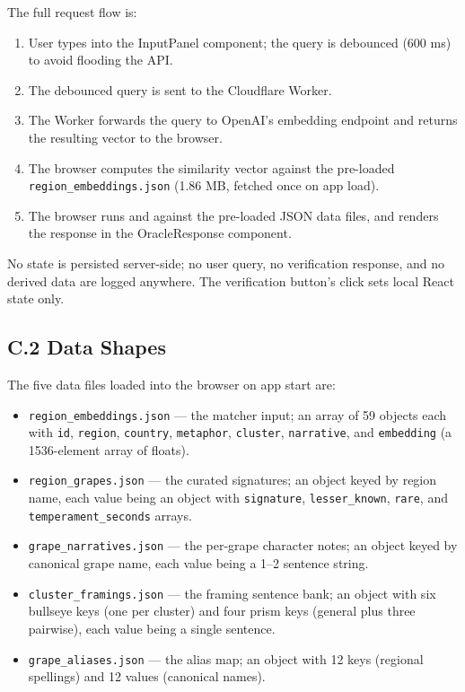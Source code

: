 \documentclass[11pt]{article}
\begin{document}
The full request flow is:

\begin{enumerate}[leftmargin=2em,itemsep=0.2em]
\item User types into the InputPanel component; the query is debounced (600 ms) to avoid flooding the API.
\item The debounced query is sent to the Cloudflare Worker.
\item The Worker forwards the query to OpenAI's embedding endpoint and returns the resulting vector to the browser.
\item The browser computes the similarity vector against the pre-loaded \texttt{region\_embeddings.json} (1.86 MB, fetched once on app load).
\item The browser runs  and  against the pre-loaded JSON data files, and renders the response in the OracleResponse component.
\end{enumerate}

No state is persisted server-side; no user query, no verification response, and no derived data are logged anywhere. The verification button's click sets local React state only.

\subsection*{C.2 Data Shapes}
The five data files loaded into the browser on app start are:

\begin{itemize}[leftmargin=2em,itemsep=0.2em]
\item \texttt{region\_embeddings.json} --- the matcher input; an array of 59 objects each with \texttt{id}, \texttt{region}, \texttt{country}, \texttt{metaphor}, \texttt{cluster}, \texttt{narrative}, and \texttt{embedding} (a 1536-element array of floats).
\item \texttt{region\_grapes.json} --- the curated signatures; an object keyed by region name, each value being an object with \texttt{signature}, \texttt{lesser\_known}, \texttt{rare}, and \texttt{temperament\_seconds} arrays.
\item \texttt{grape\_narratives.json} --- the per-grape character notes; an object keyed by canonical grape name, each value being a 1--2 sentence string.
\item \texttt{cluster\_framings.json} --- the framing sentence bank; an object with six bullseye keys (one per cluster) and four prism keys (general plus three pairwise), each value being a single sentence.
\item \texttt{grape\_aliases.json} --- the alias map; an object with 12 keys (regional spellings) and 12 values (canonical names).
\end{itemize}
\end{document}
